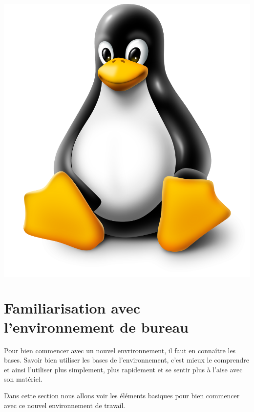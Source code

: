 \documentclass[12pt]{book}
\begin{document}
\begin{minipage}[c]{.18\textwidth}
	\centering
	\includegraphics[width=.85\textwidth]{include/linux.png}
\end{minipage}
\section{Familiarisation avec l'environnement de bureau}
	Pour bien commencer avec un nouvel envrironnement, il faut en connaître les bases.
	Savoir bien utiliser les bases de l'environnement, c'est mieux le comprendre et ainsi l'utiliser plus simplement, plus rapidement et se sentir plus à l'aise avec son matériel.\par
	Dans cette section nous allons voir les éléments basiques pour bien commencer avec ce nouvel environnement de travail.
\end{document}
